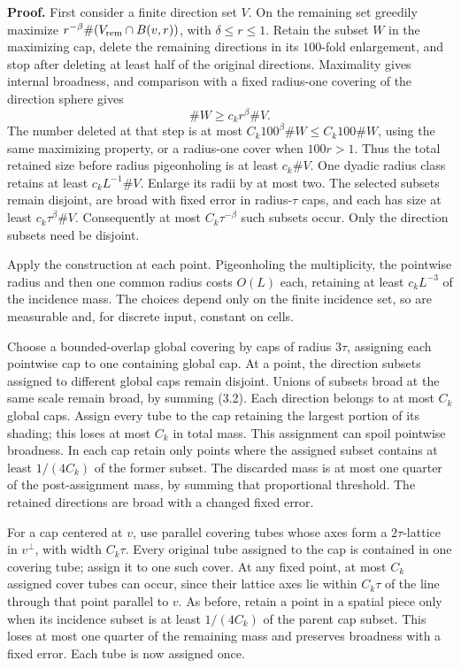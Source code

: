 \documentclass[
  11pt,
  a4paper,
]{article}
\begin{document}
\textbf{Proof.} First consider a finite direction set \(V\). On the
remaining set greedily maximize
\(r^{-\beta}\#(V_{\rm rem}\cap B(v,r))\), with \(\delta\le r\le1\).
Retain the subset \(W\) in the maximizing cap, delete the remaining
directions in its \(100\)-fold enlargement, and stop after deleting at
least half of the original directions. Maximality gives internal
broadness, and comparison with a fixed radius-one covering of the
direction sphere gives \[\#W\ge c_k r^\beta\#V.\] The number deleted at
that step is at most \(C_k100^\beta\#W\le C_k100\#W\), using the same
maximizing property, or a radius-one cover when \(100r>1\). Thus the
total retained size before radius pigeonholing is at least \(c_k\#V\).
One dyadic radius class retains at least \(c_kL^{-1}\#V\). Enlarge its
radii by at most two. The selected subsets remain disjoint, are broad
with fixed error in radius-\(\tau\) caps, and each has size at least
\(c_k\tau^\beta\#V\). Consequently at most \(C_k\tau^{-\beta}\) such
subsets occur. Only the direction subsets need be disjoint.

Apply the construction at each point. Pigeonholing the multiplicity, the
pointwise radius and then one common radius costs \(O(L)\) each,
retaining at least \(c_kL^{-3}\) of the incidence mass. The choices
depend only on the finite incidence set, so are measurable and, for
discrete input, constant on cells.

Choose a bounded-overlap global covering by caps of radius \(3\tau\),
assigning each pointwise cap to one containing global cap. At a point,
the direction subsets assigned to different global caps remain disjoint.
Unions of subsets broad at the same scale remain broad, by summing
(3.2). Each direction belongs to at most \(C_k\) global caps. Assign
every tube to the cap retaining the largest portion of its shading; this
loses at most \(C_k\) in total mass. This assignment can spoil pointwise
broadness. In each cap retain only points where the assigned subset
contains at least \(1/(4C_k)\) of the former subset. The discarded mass
is at most one quarter of the post-assignment mass, by summing that
proportional threshold. The retained directions are broad with a changed
fixed error.

For a cap centered at \(v\), use parallel covering tubes whose axes form
a \(2\tau\)-lattice in \(v^\perp\), with width \(C_k\tau\). Every
original tube assigned to the cap is contained in one covering tube;
assign it to one such cover. At any fixed point, at most \(C_k\)
assigned cover tubes can occur, since their lattice axes lie within
\(C_k\tau\) of the line through that point parallel to \(v\). As before,
retain a point in a spatial piece only when its incidence subset is at
least \(1/(4C_k)\) of the parent cap subset. This loses at most one
quarter of the remaining mass and preserves broadness with a fixed
error. Each tube is now assigned once.
\end{document}
